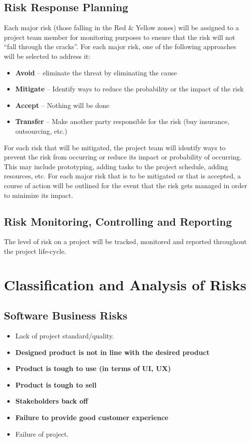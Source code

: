 \documentclass{article}
\begin{document}
\subsection{Risk Response Planning}
Each major risk (those falling in the Red & Yellow zones) will be assigned to a project team member for monitoring purposes to ensure that the risk will not “fall through the cracks”.  
For each major risk, one of the following approaches will be selected to address it:
\begin{itemize}
    \item \textbf{Avoid} – eliminate the threat by eliminating the cause
    \item \textbf{Mitigate} – Identify ways to reduce the probability or the impact of the risk
    \item \textbf{Accept} – Nothing will be done 
    \item \textbf{Transfer} – Make another party responsible for the risk (buy insurance, outsourcing, etc.)
\end{itemize}

For each risk that will be mitigated, the project team will identify ways to prevent the risk from occurring or reduce its impact or probability of occurring.  This may include prototyping, adding tasks to the project schedule, adding resources, etc.
For each major risk that is to be mitigated or that is accepted, a course of action will be outlined for the event that the risk gets managed in order to minimize its impact.
\subsection{Risk Monitoring, Controlling and Reporting}
The level of risk on a project will be tracked, monitored and reported throughout the project life-cycle.  

\section{Classification and Analysis of Risks}
\subsection{Software Business Risks}
\begin{itemize}
    \item Lack of project standard/quality.
    \item \textbf{Designed product is not in line with the desired product}
    \item \textbf{Product is tough to use (in terms of UI, UX)}
    \item \textbf{Product is tough to sell}
    \item \textbf{Stakeholders back off}
    \item \textbf{Failure to provide good customer experience}
    \item Failure of project.
\end{itemize}
\end{document}
